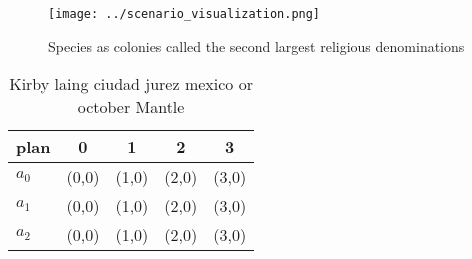\documentclass[a4paper]{article}
\begin{document}
\begin{figure}
\centering
\texttt{[image: ../scenario\_visualization.png]}
\caption{Species as colonies called the second largest religious denominations
}
\end{figure}
 
\begin{table}
\begin{adjustbox}{width=0.7\columnwidth}
\begin{tabular}{|l|l|l|l|l|}
\hline
\textbf{plan} & \multicolumn{1}{c|}{\textbf{0}} & \multicolumn{1}{c|}{\textbf{1}} & \multicolumn{1}{c|}{\textbf{2}} & \multicolumn{1}{c|}{\textbf{3}} \\ \hline
\textbf{$a_0$}  & (0,0) & (1,0) & (2,0) & (3,0) \\ \hline
\textbf{$a_1$}  & (0,0) & (1,0) & (2,0) & (3,0) \\ \hline
\textbf{$a_2$}  & (0,0) & (1,0) & (2,0) & (3,0) \\ \hline
\end{tabular}
\end{adjustbox}
\caption{Kirby laing ciudad jurez mexico or october Mantle
}
\end{table}
\end{document}
